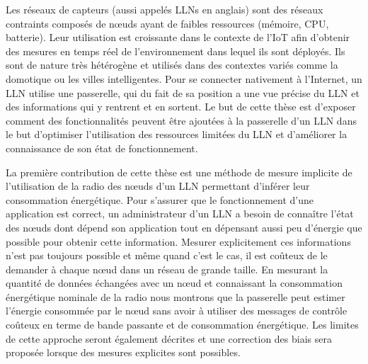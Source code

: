 {%


Les réseaux de capteurs (aussi appelés \ac{LLN}s en anglais) sont des réseaux contraints composés de nœuds ayant de faibles ressources (mémoire, CPU, batterie).
Leur utilisation est croissante dans le contexte de l'\ac{IoT} afin d'obtenir des mesures en temps réel de l'environnement dans lequel ils sont déployés.
Ils sont de nature très hétérogène et utilisés dans des contextes variés comme la domotique ou les villes intelligentes.
Pour se connecter nativement à l'Internet, un \ac{LLN} utilise une passerelle, qui du fait de sa position a une vue précise du \ac{LLN} et des informations qui y rentrent et en sortent.
Le but de cette thèse est d'exposer comment des fonctionnalités peuvent être ajoutées à la passerelle d'un \ac{LLN} dans le but d'optimiser l'utilisation des ressources limitées du \ac{LLN} et d'améliorer la connaissance de son état de fonctionnement.

La première contribution de cette thèse est une méthode de mesure implicite de l'utilisation de la radio des nœuds d'un \ac{LLN} permettant d'inférer leur consommation énergétique.
Pour s'assurer que le fonctionnement d'une application est correct, un administrateur d'un \ac{LLN} a besoin de connaître l'état des nœuds dont dépend son application tout en dépensant aussi peu d'énergie que possible pour obtenir cette information.
Mesurer explicitement ces informations n'est pas toujours possible et même quand c'est le cas, il est coûteux de le demander à chaque nœud dans un réseau de grande taille.
En mesurant la quantité de données échangées avec un nœud et connaissant la consommation énergétique nominale de la radio nous montrons que la passerelle peut estimer l'énergie consommée par le nœud sans avoir à utiliser des messages de contrôle coûteux en terme de bande passante et de consommation énergétique.
Les limites de cette approche seront également décrites et une correction des biais sera proposée lorsque des mesures explicites sont possibles.

}
